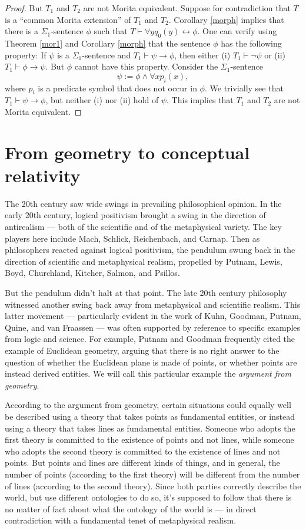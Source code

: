 \begin{proof}
But $T_1$ and $T_2$ are not Morita equivalent. Suppose for
contradiction that $T$ is a ``common Morita extension'' of $T_1$ and
$T_2$.  Corollary \ref{morph} implies that there is a
$\Sigma_1$-sentence $\phi$ such that
$T\vdash \forall yq_0(y)\leftrightarrow\phi$. One can verify using
Theorem \ref{mor1} and Corollary \ref{morph} that the sentence $\phi$
has the following property: If $\psi$ is a $\Sigma_1$-sentence and
$T_1\vdash\psi\rightarrow\phi$, then either (i) $T_1\vdash\lnot\psi$
or (ii) $T_1\vdash\phi\rightarrow\psi$. But $\phi$ cannot have this
property. Consider the $\Sigma_1$-sentence
\[ \psi:=\phi\land\forall x p_i(x) , \] where $p_i$ is a predicate
symbol that does not occur in $\phi$. We trivially see that
$T_1\vdash \psi\rightarrow\phi$, but neither (i) nor (ii) hold of
$\psi$. This implies that $T_1$ and $T_2$ are not Morita equivalent.
\end{proof}


\section{From geometry to conceptual relativity} \label{go-geometry}

The 20th century saw wide swings in prevailing philosophical opinion.
In the early 20th century, logical positivism brought a swing in the
direction of antirealism --- both of the scientific and of the
metaphysical variety.  The key players here include Mach, Schlick,
Reichenbach, and Carnap.  Then as philosophers reacted against logical
positivism, the pendulum swung back in the direction of scientific and
metaphysical realism, propelled by Putnam, Lewis, Boyd, Churchland,
Kitcher, Salmon, and Psillos.

But the pendulum didn't halt at that point.  The late 20th century
philosophy witnessed another swing back away from metaphysical and
scientific realism.  This latter movement --- particularly evident in
the work of Kuhn, Goodman, Putnam, Quine, and van Fraassen --- was
often supported by reference to specific examples from logic and
science.  For example, Putnam and Goodman frequently cited the example
of Euclidean geometry, arguing that there is no right answer to the
question of whether the Euclidean plane is made of points, or whether
points are instead derived entities.  We will call this particular
example the {\it argument from geometry}.

According to the argument from geometry, certain situations could
equally well be described using a theory that takes points as
fundamental entities, or instead using a theory that takes lines as
fundamental entities.  Someone who adopts the first theory is
committed to the existence of points and not lines, while someone who
adopts the second theory is committed to the existence of lines and
not points.  But points and lines are different kinds of things, and
in general, the number of points (according to the first theory) will
be different from the number of lines (according to the second
theory).  Since both parties correctly describe the world, but use
different ontologies to do so, it's supposed to follow that there is
no matter of fact about what the ontology of the world is --- in
direct contradiction with a fundamental tenet of metaphysical realism.

